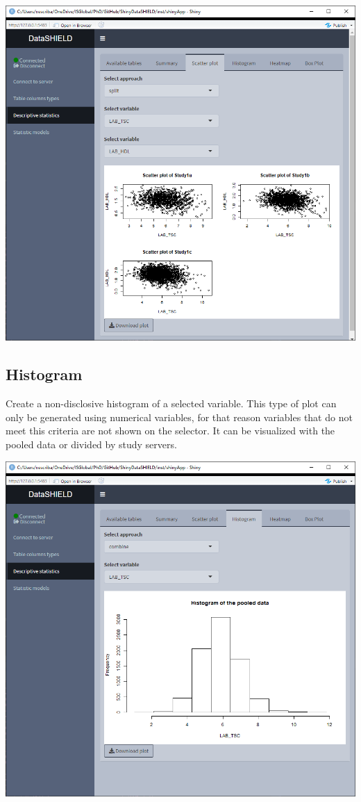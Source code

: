 \documentclass[
]{book}
\begin{document}
\includegraphics{images/descriptive_stats3_2.png}

\hypertarget{histogram}{%
\subsection{Histogram}\label{histogram}}

Create a non-disclosive histogram of a selected variable. This type of plot can only be generated using numerical variables, for that reason variables that do not meet this criteria are not shown on the selector. It can be visualized with the pooled data or divided by study servers.

\includegraphics{images/descriptive_stats4.png}
\end{document}
